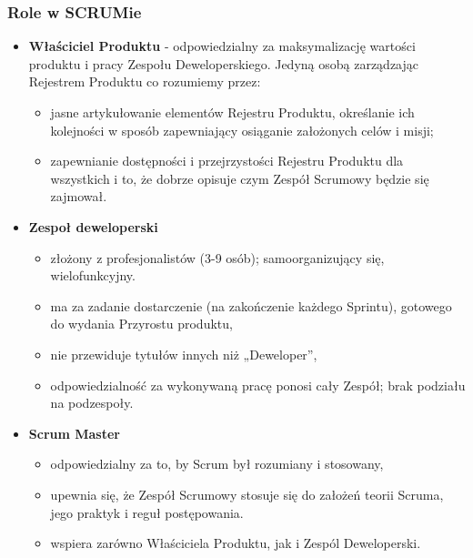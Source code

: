 \documentclass[a4paper]{article}
\begin{document}
    \subsubsection{Role w SCRUMie}
    \begin{itemize}
        \item \textbf{Właściciel Produktu} - odpowiedzialny za maksymalizację wartości produktu i pracy Zespołu
        Deweloperskiego. Jedyną osobą zarządzając Rejestrem Produktu co rozumiemy przez:
        \begin{itemize}
            \item jasne artykułowanie elementów Rejestru Produktu, określanie
            ich kolejności w sposób zapewniający osiąganie założonych celów i misji;
            \item zapewnianie dostępności i przejrzystości Rejestru Produktu dla wszystkich i to, że dobrze opisuje czym
            Zespół Scrumowy będzie się zajmował.
        \end{itemize}
        \item \textbf{Zespoł deweloperski}
        \begin{itemize}
            \item złożony z profesjonalistów (3-9 osób); samoorganizujący się, wielofunkcyjny.
            \item ma za zadanie dostarczenie (na zakończenie
            każdego Sprintu), gotowego do wydania Przyrostu produktu,
            \item nie przewiduje tytułów innych niż „Deweloper”,
            \item odpowiedzialność za wykonywaną pracę ponosi cały Zespół; brak podziału na podzespoły.
        \end{itemize}
        \item \textbf{Scrum Master}
        \begin{itemize}
            \item odpowiedzialny za to, by Scrum był rozumiany i stosowany,
            \item upewnia się, że Zespół Scrumowy stosuje się do założeń teorii Scruma, jego praktyk i reguł postępowania.
            \item wspiera zarówno Właściciela Produktu, jak i Zespól Deweloperski.
        \end{itemize}
    \end{itemize}
\end{document}
